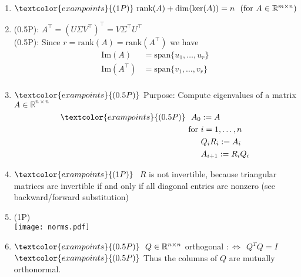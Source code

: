 {\color{solution}
\begin{enumerate}
		\item $\textcolor{exampoints}{(1P)}~\text{rank}(A)+\text{dim}(\text{ker}(A))=n~~(\text{for}~A\in\mathbb{R}^{m\times n})$
		\item  \textcolor{exampoints}{(0.5P)}: $A^\top = (U \Sigma V^\top)^\top = V \Sigma^\top U^\top $\\
		\textcolor{exampoints}{(0.5P)}: Since $r = \text{rank}(A) = \text{rank}(A^\top)$ we have
		\begin{align*}
		\text{Im}(A) &= \text{span}\{u_1, \ldots, u_r\}\\
			\text{Im}(A^\top) &= \text{span}\{v_1, \ldots,v_r\}\\
		\end{align*}
			\item 
		$\textcolor{exampoints}{(0.5P)}$ Purpose: Compute eigenvalues of a matrix $A\in\mathbb{R}^{n\times n}$
		\begin{align*}
		\textcolor{exampoints}{(0.5P)}~~A_0&:=A\\
		\text{for}~&i=1,\dots,n\\
		&Q_iR_i:=A_i\\
		&A_{i+1}:=R_iQ_i
		\end{align*}
		\item 
	$\textcolor{exampoints}{(1P)}~$ $R$ is not invertible, because triangular matrices are invertible if and only if all diagonal entries are nonzero (see backward/forward substitution)	
	\item  \textcolor{exampoints}{(1P)}\\
	\texttt{[image: norms.pdf]}
		\item $\textcolor{exampoints}{(0.5P)}~~Q\in\mathbb{R}^{n\times n}$ orthogonal $:\Leftrightarrow~~Q^TQ=I$\\
	$\textcolor{exampoints}{(0.5P)}$ 
	Thus the columns of $Q$ are mutually orthonormal.
\end{enumerate}	
}